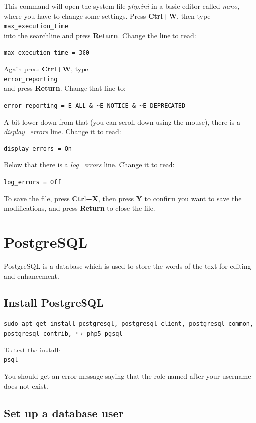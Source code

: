 \documentclass[a4paper,10pt, oneside]{book}
\begin{document}
This command will open the system file \textit{php.ini} in a basic editor called \textit{nano}, where you have to change some settings. Press \textbf{Ctrl+W}, then type\\
\verb|max_execution_time|\\
into the searchline and press \textbf{Return}. Change the line to read:

\verb|max_execution_time = 300|

Again press \textbf{Ctrl+W}, type\\
\verb|error_reporting| \\
and press \textbf{Return}. Change that line to: 

\verb|error_reporting = E_ALL & ~E_NOTICE & ~E_DEPRECATED|

A bit lower down from that (you can scroll down using the mouse), there is a \textit{display\_errors} line. Change it to read: 

\verb|display_errors = On|

Below that there is a \textit{log\_errors} line. Change it to read: 

\verb|log_errors = Off|

To save the file, press \textbf{Ctrl+X}, then press \textbf{Y} to confirm you want to save the modifications, and press \textbf{Return} to close the file.


\section{PostgreSQL}

PostgreSQL is a database which is used to store the words of the text for editing and enhancement.


\subsection{Install PostgreSQL}

\verb|sudo apt-get install postgresql, postgresql-client, postgresql-common, postgresql-contrib,|
$\hookrightarrow$ \verb|php5-pgsql|

To test the install:\\
\verb|psql|

You should get an error message saying that the role named after your username does not exist.


\subsection{Set up a database user}
\label{ss:dbuser}
\end{document}
